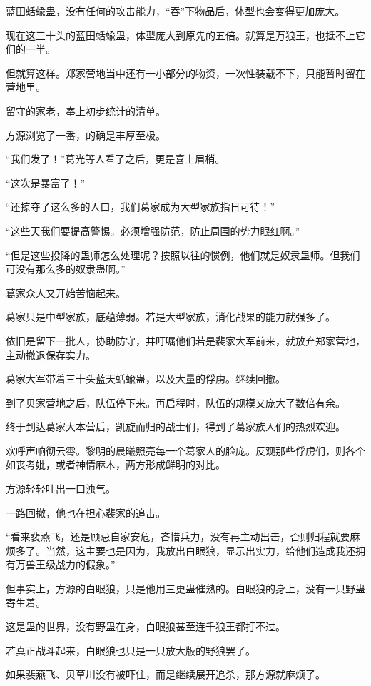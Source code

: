\begin{this_body}
蓝田蛞蝓蛊，没有任何的攻击能力，“吞”下物品后，体型也会变得更加庞大。

现在这三十头的蓝田蛞蝓蛊，体型庞大到原先的五倍。就算是万狼王，也抵不上它们的一半。

但就算这样。郑家营地当中还有一小部分的物资，一次性装载不下，只能暂时留在营地里。

留守的家老，奉上初步统计的清单。

方源浏览了一番，的确是丰厚至极。

“我们发了！”葛光等人看了之后，更是喜上眉梢。

“这次是暴富了！”

“还掠夺了这么多的人口，我们葛家成为大型家族指日可待！”

“这些天我们要提高警惕。必须增强防范，防止周围的势力眼红啊。”

“但是这些投降的蛊师怎么处理呢？按照以往的惯例，他们就是奴隶蛊师。但我们可没有那么多的奴隶蛊啊。”

葛家众人又开始苦恼起来。

葛家只是中型家族，底蕴薄弱。若是大型家族，消化战果的能力就强多了。

依旧是留下一批人，协助防守，并叮嘱他们若是裴家大军前来，就放弃郑家营地，主动撤退保存实力。

葛家大军带着三十头蓝天蛞蝓蛊，以及大量的俘虏。继续回撤。

到了贝家营地之后，队伍停下来。再启程时，队伍的规模又庞大了数倍有余。

终于到达葛家大本营后，凯旋而归的战士们，得到了葛家族人们的热烈欢迎。

欢呼声响彻云霄。黎明的晨曦照亮每一个葛家人的脸庞。反观那些俘虏们，则各个如丧考妣，或者神情麻木，两方形成鲜明的对比。

方源轻轻吐出一口浊气。

一路回撤，他也在担心裴家的追击。

“看来裴燕飞，还是顾忌自家安危，吝惜兵力，没有再主动出击，否则归程就要麻烦多了。当然，这主要也是因为，我放出白眼狼，显示出实力，给他们造成我还拥有万兽王级战力的假象。”

但事实上，方源的白眼狼，只是他用三更蛊催熟的。白眼狼的身上，没有一只野蛊寄生着。

这是蛊的世界，没有野蛊在身，白眼狼甚至连千狼王都打不过。

若真正战斗起来，白眼狼也只是一只放大版的野狼罢了。

如果裴燕飞、贝草川没有被吓住，而是继续展开追杀，那方源就麻烦了。


\end{this_body}
